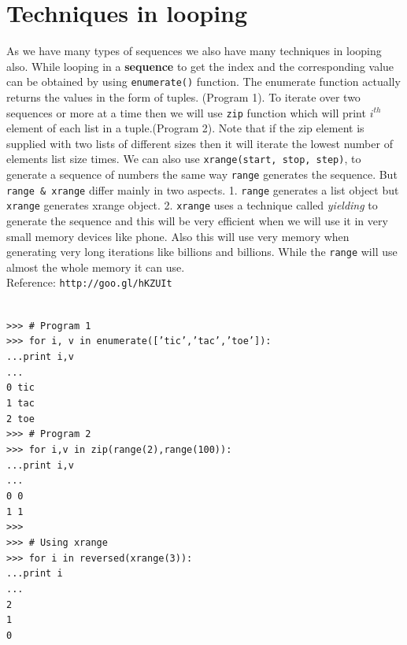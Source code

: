 \documentclass[12pt,a4paper]{article}
\begin{document}
\section{Techniques in looping}
As we have many types of sequences we also have many techniques in looping also. While looping in a \textbf{sequence} to get the index and the corresponding value can be obtained by using \texttt{enumerate()} function. The enumerate function actually returns the values in the form of tuples. (Program 1). To iterate over two sequences or more at a time then we will use \texttt{zip} function which will print $i^{th}$ element of each list in a tuple.(Program 2). Note that if the zip element is supplied with two lists of different sizes then it will iterate the lowest number of elements list size times.  We can also use \texttt{xrange(start, stop, step)}, to generate a sequence of numbers the same way \texttt{range} generates the sequence. But \texttt{range \& xrange} differ mainly in two aspects. 1. \texttt{range} generates a list object but \texttt{xrange} generates xrange object. 2. \texttt{xrange} uses a technique called \emph{yielding} to generate the sequence and this will be very efficient when we will use it in very small memory devices like phone. Also this will use very memory when generating very long iterations like billions and billions. While the \texttt{range} will use almost the whole memory it can use.\\
Reference: \texttt{http://goo.gl/hKZUIt}

\texttt{\\
>>> \# Program 1\\
>>> for i, v in enumerate(['tic','tac','toe']):\\
...\hspace{30pt}print i,v\\
...\\
0 tic\\
1 tac\\
2 toe\\
>>> \# Program 2\\
>>> for i,v in zip(range(2),range(100)):\\
...\hspace{30pt}print i,v\\
...\\
0 0\\
1 1\\
>>> \\
>>> \# Using xrange\\
>>> for i in reversed(xrange(3)):\\
...\hspace{30pt}print i\\
...\\
2\\
1\\
0\\
}
\end{document}
